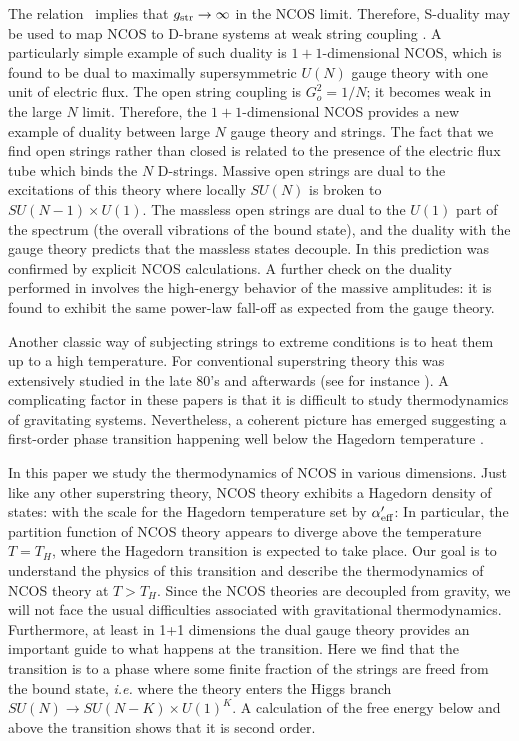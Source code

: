 The relation \inter\ implies that $g_{\rm str}\to \infty$ in the NCOS
limit. Therefore, S-duality may be used to map NCOS to D-brane systems
at weak string coupling \cite{GMSS,KM}. A particularly simple example
of such duality is $1+1$-dimensional NCOS, which is found to be dual to
maximally supersymmetric $U(N)$ gauge theory with one unit of electric
flux. The open string coupling is $G_o^2 = 1/N$; it becomes weak in
the large $N$ limit. Therefore, the $1+1$-dimensional NCOS provides a
new example of duality between large $N$ gauge theory and strings. The
fact that we find open strings rather than closed is related to the
presence of the electric flux tube which binds the $N$ D-strings.
Massive open strings are dual to the excitations of this theory where
locally $SU(N)$ is broken to $SU(N-1) \times U(1)$. The massless open
strings are dual to the $U(1)$ part of the spectrum (the overall
vibrations of the bound state), and the duality with the gauge theory
predicts that the massless states decouple. In \cite{KM} this
prediction was confirmed by explicit NCOS calculations.  A further
check on the duality performed in \cite{KM} involves the high-energy
behavior of the massive amplitudes: it is found to exhibit the same
power-law fall-off as expected from the gauge theory.

Another classic way of subjecting strings to extreme conditions is to
heat them up to a high temperature.  For conventional superstring
theory this was extensively studied in the late 80's
\cite{Kogan,Sathiapalan,AW} and afterwards (see for instance
\cite{Bowick,Tan,Lowe}).  A complicating factor in these papers is that it
is difficult to study thermodynamics of gravitating
systems. Nevertheless, a coherent picture has emerged suggesting a
first-order phase transition happening well below the Hagedorn
temperature \cite{AW}.

In this paper we study the thermodynamics of NCOS in various dimensions.
Just like any other superstring theory, NCOS theory exhibits
a Hagedorn density of states:
with the scale for the Hagedorn temperature set by $\alpha'_{\rm eff}$:
In particular, the partition function of
NCOS theory appears to diverge above the temperature $T=T_H$,
where the Hagedorn
transition is expected to take place.  Our goal is to understand the
physics of this transition and describe the thermodynamics of NCOS
theory at $T > T_H$.
Since the NCOS theories are decoupled from gravity, we will
not face the usual difficulties associated with gravitational
thermodynamics. Furthermore, at least in 1+1 dimensions the dual
gauge theory provides an important guide to what happens at the transition.
Here we find that the transition is to a phase where some
finite fraction of the strings are freed from the bound
state, {\it i.e.}{} where the theory
enters the Higgs branch $SU(N)\to SU(N-K)\times U(1)^K$.
A calculation of the free energy below and above the transition shows
that it is second order.

